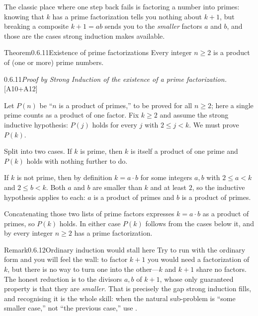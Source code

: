 \documentclass[main.tex]{subfiles}
\begin{document}
\noindent The classic place where one step back fails is factoring a number into primes: knowing that
$k$ has a prime factorization tells you nothing about $k+1$, but breaking a composite $k+1=ab$ sends
you to the \emph{smaller} factors $a$ and $b$, and those are the cases strong induction makes
available.

\begin{Obj}{Theorem}{0.6.11}{Existence of prime factorizations}
Every integer $n\ge 2$ is a product of (one or more) prime numbers.
\end{Obj}

\begin{Prf}{0.6.11}{\itshape Proof by Strong Induction of the existence of a prime factorization.}{[A10+A12]}
\item Let $P(n)$ be ``$n$ is a product of primes,'' to be proved for all $n\ge 2$; here a single prime
counts as a product of one factor. Fix $k\ge 2$ and assume the strong inductive hypothesis: $P(j)$
holds for every $j$ with $2\le j<k$. We must prove $P(k)$.
\item Split into two cases. If $k$ is prime, then $k$ is itself a product of one prime and $P(k)$
holds with nothing further to do.
\item If $k$ is not prime, then by definition $k=a\cdot b$ for some integers $a,b$ with $2\le a<k$ and
$2\le b<k$. Both $a$ and $b$ are smaller than $k$ and at least $2$, so the inductive hypothesis applies
to each: $a$ is a product of primes and $b$ is a product of primes.
\item Concatenating those two lists of prime factors expresses $k=a\cdot b$ as a product of primes, so
$P(k)$ holds. In either case $P(k)$ follows from the cases below it, and by  every integer
$n\ge 2$ has a prime factorization.
\end{Prf}

\begin{ObjL}{Remark}{0.6.12}{Ordinary induction would stall here}
Try to run  with the ordinary form and you will feel the wall: to factor $k+1$ you would
need a factorization of $k$, but there is no way to turn one into the other---$k$ and $k+1$ share no
factors. The honest reduction is to the divisors $a,b$ of $k+1$, whose only guaranteed property is
that they are \emph{smaller}. That is precisely the gap strong induction fills, and recognising it is
the whole skill: when the natural sub-problem is ``some smaller case,'' not ``the previous case,'' use
.
\end{ObjL}
\end{document}
